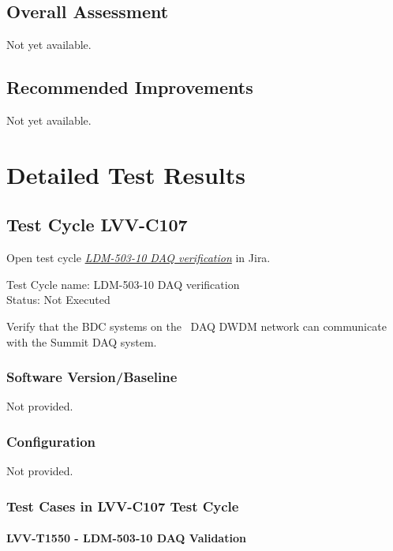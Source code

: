 \documentclass[DM,lsstdraft,STR,toc]{lsstdoc}
\begin{document}
\subsection{Overall Assessment}
\label{sect:overallassessment}

Not yet available.

\subsection{Recommended Improvements}
\label{sect:recommendations}

Not yet available.

\newpage
\section{Detailed Test Results}
\label{sect:detailedtestresults}

\subsection{Test Cycle LVV-C107 }

Open test cycle {\it \href{https://jira.lsstcorp.org/secure/Tests.jspa#/testrun/LVV-C107}{LDM-503-10 DAQ verification}} in Jira.

Test Cycle name: LDM-503-10 DAQ verification\\
Status: Not Executed

Verify that the BDC systems on the~ DAQ DWDM network can communicate
with the Summit DAQ system. ~\\[2\baselineskip]

\subsubsection{Software Version/Baseline}
Not provided.

\subsubsection{Configuration}
Not provided.

\subsubsection{Test Cases in LVV-C107 Test Cycle}

\paragraph{ LVV-T1550 - LDM-503-10 DAQ Validation }\mbox{}\\
\end{document}
